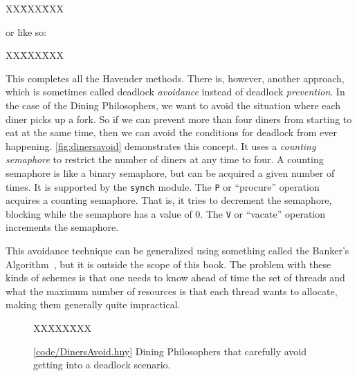 \documentclass{report}
\newcommand{\harmonysource}[1]{
\begin{tabbing}
XX\=XXX\=XXX\kill
    
\end{tabbing}
}
\newcommand{\harmonylink}[1]{%
[\href{https://harmony.cs.cornell.edu/#1}{\underline{#1}}]%
}
\newenvironment{code}{
\tcolorbox
}{
\endtcolorbox
}
\begin{document}
\vspace{1em}
\begin{code}
\harmonysource{dinersfix}
\end{code}
\vspace{1em}

or like so:

\vspace{1em}
\begin{code}
\harmonysource{dinersfix2}
\end{code}
\vspace{1em}

This completes all the Havender methods.
There is, however, another approach, which is sometimes called deadlock
\emph{avoidance}
%
instead of deadlock \emph{prevention}.
In the case of the Dining Philosophers, we want to avoid the situation where each
diner picks up a fork.  So if we can prevent more than four diners from starting to
eat at the same time, then we can avoid the conditions for deadlock from ever
happening.
\autoref{fig:dinersavoid} demonstrates this concept.  It uses a
\emph{counting semaphore} to restrict the number of diners at any time to
four.  A counting semaphore is like a binary semaphore, but can be
acquired a given number of times.  It is supported by the \texttt{synch}
module.  The \texttt{P} or ``procure'' operation acquires a counting
semaphore.  That is, it tries to decrement the semaphore, blocking while
the semaphore has a value of 0.  The \texttt{V} or ``vacate'' operation
increments the semaphore.

This avoidance technique can be generalized using something called the
Banker's Algorithm~\cite{EWD108}, but it is outside the scope of this book.
The problem with these kinds of schemes is that one needs to know ahead of time
the set of threads and what the maximum number of resources is that each thread
wants to allocate, making them generally quite impractical.

\begin{figure}
\begin{code}
\harmonysource{DinersAvoid}
\end{code}
\caption{\harmonylink{code/DinersAvoid.hny} Dining Philosophers that carefully avoid getting into a deadlock
scenario.}
\label{fig:dinersavoid}
\end{figure}
\end{document}
